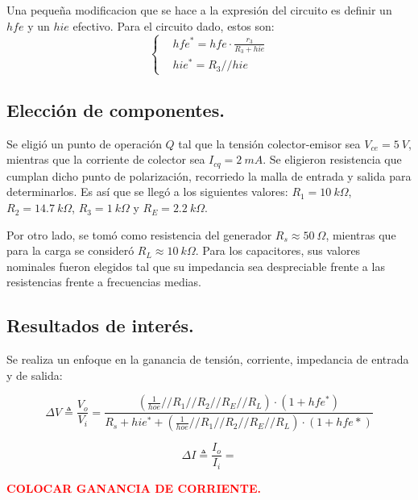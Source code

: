 \documentclass[a4paper]{article}
\begin{document}
Una pequeña modificacion que se hace a la expresión del circuito es definir un $hfe$ y un $hie$ efectivo. Para el circuito dado, estos son:
\begin{equation*}
\left\{
\begin{aligned}
	& hfe^* = hfe\cdot \frac{r_3}{R_3+hie} \\
	& hie^* = R_3 // hie
\end{aligned}
\right.
\end{equation*}

\subsection{Elección de componentes.}
Se eligió un punto de operación $Q$ tal que la tensión colector-emisor sea $V_{ce} = 5 \ V$, mientras que la corriente de colector sea $I_{cq} = 2 \ mA$. Se eligieron resistencia que cumplan dicho punto de polarización, recorriedo la malla de entrada y salida para determinarlos. Es así que se llegó a los siguientes valores: $R_1 = 10 \ k\Omega$, $R_2 = 14.7 \ k\Omega$, $R_3 = 1 \ k\Omega$ y $R_E = 2.2 \ k\Omega$.

Por otro lado, se tomó como resistencia del generador $R_s \approx 50 \ \Omega$, mientras que para la carga se consideró $R_L \approx 10 \ k\Omega$. Para los capacitores, sus valores nominales fueron elegidos tal que su impedancia sea despreciable frente a las resistencias frente a frecuencias medias.

\subsection{Resultados de interés.}
Se realiza un enfoque en la ganancia de tensión, corriente, impedancia de entrada y de salida:


\begin{equation}
	\Delta V \triangleq \frac{V_o}{V_i} = \frac{ \left(\frac{1}{hoe} // R_1 // R_2 // R_E // R_L  \right)\cdot (1+hfe^*)}{R_s + hie^* + \left(\frac{1}{hoe} // R_1 // R_2 // R_E // R_L  \right)\cdot (1+hfe*) } 
\end{equation}

\begin{equation}
	\Delta I \triangleq \frac{I_o}{I_i} =  
\end{equation}

\begin{center}
	\textcolor{red}{\textbf{COLOCAR GANANCIA DE CORRIENTE.}}
\end{center}
\end{document}
